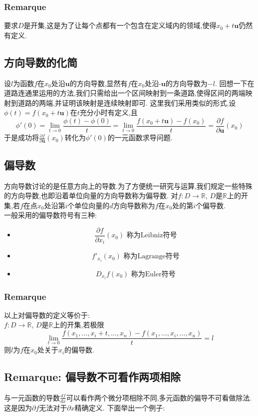 \documentclass[12pt, a4paper, oneside]{ctexbook}
\begin{document}
  \subsubsection{Remarque}
  要求$D$是开集,这是为了让每个点都有一个包含在定义域内的领域,使得$x_0+t\textbf{u}$仍然有定义.
  \subsection{方向导数的化简}
  设$l$为函数$f$在$x_0$处沿$\textbf{u}$的方向导数,显然有$f$在$x_0$处沿$\textbf{-u}$的方向导数为$-l$.
  回想一下在道路连通里运用的方法,我们只需给出一个区间映射到一条道路,使得区间的两端映射到道路的两端,并证明该映射是连续映射即可.
  这里我们采用类似的形式,设$\phi(t)=f(x_0+t\textbf{u})$在$t$充分小时有定义,且
  $$
  \phi'(0)=\lim_{t \to 0} \frac{\phi(t)-\phi(0)}{t} =\lim_{t \to 0}\frac{f(x_0+t\textbf{u})-f(x_0)}{t}=\frac{\partial f}{\partial \textbf{u}}(x_0)
  $$
  于是成功将$\frac{\partial f}{\partial \textbf{u}}(x_0)$转化为$\phi'(0)$的一元函数求导问题.
  \subsection{偏导数}
  方向导数讨论的是任意方向上的导数.为了方便统一研究与运算,我们规定一些特殊的方向导数,也即沿着单位向量的方向导数称为偏导数.
  对$f:D\rightarrow \mathbb{R}$, $D$是$\mathbb{R}$上的开集,若$f$在点$x_0$处沿第$i$个单位向量的$d$方向导数称为$f$在$x_0$处的第$i$个偏导数.\\
  一般采用的偏导数符号有三种:
  \begin{itemize}
    \item $$\frac{\partial f}{\partial x_i}(x_0)\text{ 称为Leibniz符号}$$ 
    \item $$f'_{x_i}(x_0) \text{ 称为Lagrange符号}$$
    \item $$D_{x_i}f(x_0) \text{ 称为Euler符号}$$
  \end{itemize}
  \subsubsection{Remarque}
  以上对偏导数的定义等价于:\\
  
  $f:D\rightarrow \mathbb{R}$, $D$是$\mathbb{R}$上的开集,若极限
  $$
  \lim_{t \to 0}\frac{f(x_1,\dots,x_i+t,\dots,x_n)-f(x_1,\dots,x_i,\dots,x_n)}{t}=l
  $$
  则$l$为$f$在$x_0$处关于$x_i$的偏导数.
  \subsection{Remarque: 偏导数不可看作两项相除}
  与一元函数的导数$\frac{d f}{d x}$可以看作两个微分项相除不同,多元函数的偏导不可看做除法.这是因为$\partial f$无法对于$\partial x$精确定义.
  下面举出一个例子:
\end{document}
